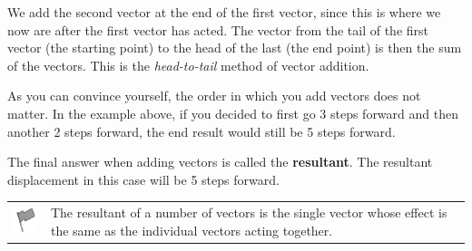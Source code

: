        \par 
        \label{m38813*id188328}We add the second vector at the end of the first vector, since this is where we now are after the first vector has acted. The vector from the tail of the
first vector (the starting point) to the head of the last (the end
point) is then the sum of the vectors. This is the \textsl{head-to-tail} method of vector addition.\par 
        \label{m38813*id188340}As you can convince yourself, the order in which you add vectors does
not matter. In the example above, if you decided to first go 3 steps
forward and then another 2 steps forward, the end result would still be 5
steps forward.\par 
        \label{m38813*id188345}The final answer when adding vectors is called the \textbf{resultant}. The resultant displacement in this case will be 5 steps forward.\par 
\label{m38813*fhsst!!!underscore!!!id269}\begin{definition}
	  \begin{tabular*}{15 cm}{m{15 mm}m{}}
	\hspace*{-50pt}  \includegraphics[width=0.5in]{col11305.imgs/psflag2.png}   & \Definition{   \label{id2512331}\textbf{ Resultant of Vectors }} { \label{m38813*meaningfhsst!!!underscore!!!id269}
        \label{m38813*id188362}The resultant of a number of vectors is the single vector whose effect is the same as the individual vectors acting together. \par 
         } 
      \end{tabular*}
      \end{definition}

